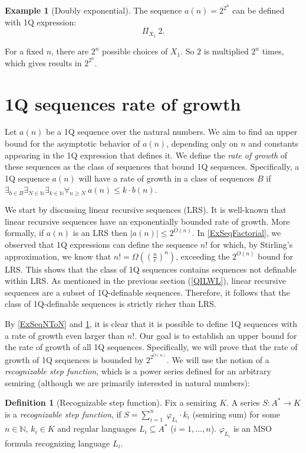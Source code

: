 \documentclass[12pt]{article}
\theoremstyle{definition}
\newtheorem{definition}{Definition}[section]
\newtheorem{example}{Example}[section]
\begin{document}
\begin{example}[Doubly exponential]
\label{ExSeqDoubleExponential}
    The sequence $a(n) = 2^{2^n}$ can be defined with 1Q expression:
    $$\Pi_{X_1} \ 2.$$

    For a fixed $n$, there are $2^n$ possible choices of $X_1$. So $2$ is multiplied $2^n$ times, which gives results in $2^{2^n}$.
\end{example}

\section{1Q sequences rate of growth}
\label{Sec1QRateOfGrowth}
Let $a(n)$ be a 1Q sequence over the natural numbers. We aim to find an upper bound for the asymptotic behavior of $a(n)$, depending only on $n$ and constants appearing in the 1Q expression that defines it. We define the \emph{rate of growth} of these sequences as the class of sequences that bound 1Q sequences. Specifically, a 1Q sequence $a(n)$ will have a rate of growth in a class of sequences $B$ if $\exists_{b \in B} \exists_{N \in \mathbb{N}} \exists_{k \in \mathbb{N}} \forall_{n \geq N} \ a(n) \leq k \cdot b(n)$.

We start by discussing linear recursive sequences (LRS). It is well-known that linear recursive sequences have an exponentially bounded rate of growth. More formally, if $a(n)$ is an LRS then $|a(n)| \le 2^{O(n)}$. In \cref{ExSeqFactorial}, we observed that 1Q expressions can define the sequence $n!$ for which, by Stirling's approximation, we know that $n! = \Omega((\frac{n}{e})^n)$, exceeding the $2^{O(n)}$ bound for LRS. This shows that the class of 1Q sequences contains sequences not definable within LRS. As mentioned in the previous section (\ref{QILWL}), linear recursive sequences are a subset of 1Q-definable sequences. Therefore, it follows that the class of 1Q-definable sequences is strictly richer than LRS.

By \cref{ExSeqNToN} and \cref{ExSeqDoubleExponential}, it is clear that it is possible to define 1Q sequences with a rate of growth even larger than $n!$. Our goal is to establish an upper bound for the rate of growth of all 1Q sequences. Specifically, we will prove that the rate of growth of 1Q sequences is bounded by $2^{2^{O(n)}}$. We will use the notion of a \emph{recognizable step function}, which is a power series defined for an arbitrary semiring (although we are primarily interested in natural numbers):

\begin{definition}[Recognizable step function]
    \label{DefRecStepFun}
    Fix a semiring $K$.
    A series $S: A^* \rightarrow K$ is a \emph{recognizable step function}, if $S = \sum_{i = 1}^{n} \ \varphi_{L_i} \cdot k_i$ (semiring sum) for some $n \in \mathbb{N}$, $k_i \in K$ and regular languages $L_i \subseteq A^*$ ($i=1,\ldots,n$). $\varphi_{L_i}$ is an MSO formula recognizing language $L_i$.
\end{definition}
\end{document}
